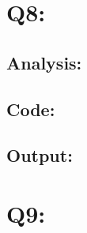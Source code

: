 \documentclass[11pt]{article}
\begin{document}
\section*{Q8:}
\subsection*{Analysis:}

\subsection*{Code:}



\subsection*{Output:}

\section*{Q9:}

\begin{appendices}\label{appendix}
  
\end{appendices}

\newpage

% 
% 
\end{document}
